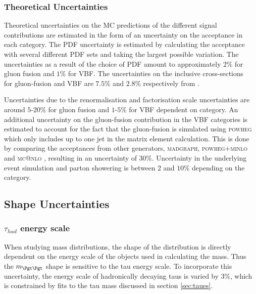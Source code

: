 \subsubsection{\textbf{Theoretical Uncertainties}} 
Theoretical uncertainties on the \ac{MC} predictions of the different signal
contributions are estimated in the form of an uncertainty on the acceptance in
each category. The \ac{PDF} uncertainty is estimated by calculating the
acceptance with several different \ac{PDF} sets and taking the largest possible
variation. The uncertainties as a result of the choice of \ac{PDF} amount to
approximately $2\%$ for gluon fusion and $1\%$ for \ac{VBF}. The uncertainties
on the inclusive cross-sections for gluon-fusion and \ac{VBF} are $7.5\%$ and
$2.8\%$ respectively from
\cite{LHCHiggsCrossSectionWorkingGroup:2011ti,Dittmaier:2012vm,Heinemeyer:2013tqa}.

Uncertainties due to the renormalisation and factorisation scale uncertainties
are around $5$-$20\%$ for gluon fusion and $1$-$5\%$ for \ac{VBF} dependent on
category. An additional uncertainty on the gluon-fusion contribution in the
VBF categories is estimated to account for the fact that the gluon-fusion is
simulated using \textsc{powheg} which only includes up to one jet in the matrix
element calculation. This is done by comparing the acceptances from other
generators, \textsc{madgraph}, \textsc{powheg+minlo} \cite{Hamilton:2012np} and
\textsc{mc@nlo} \cite{Frixione:2002ik}, resulting in an uncertainty of $30\%$.
Uncertainty in the underlying event simulation and parton showering is between
$2$ and $10\%$ depending on the category. 


\subsection{Shape Uncertainties}
\label{sec:systematicUncertainties_shape}

\subsubsection{$\tau_{had}$ energy scale} 
When studying mass distributions, the shape of the distribution is directly
dependent on the energy scale of the objects used in calculating the mass. Thus the
$m_{\Pgt\Pgt}$ shape is sensitive to the tau energy scale.
To incorporate this uncertainty, the energy scale of hadronically decaying taus is varied by $3\%$,
which is constrained by fits to the tau mass discussed in section \ref{sec:taues}.

